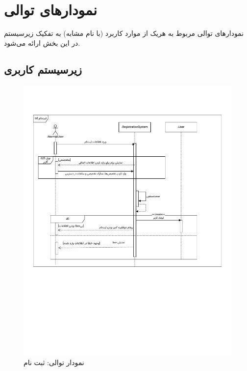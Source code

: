 \chapter{نمودارهای توالی}


نمودارهای توالی مربوط به هریک از موارد کاربرد (با نام مشابه) به تفکیک زیرسیستم در این بخش ارائه می‌شود.

\newpage
\section{زیرسیستم کاربری}

\begin{figure}[ht!]
	\centering
	\includegraphics[scale=0.6, page=1]{figs/OOD-Sequence-1.pdf}
	\caption{نمودار توالی: ثبت نام}
\end{figure}
\FloatBarrier
\newpage

